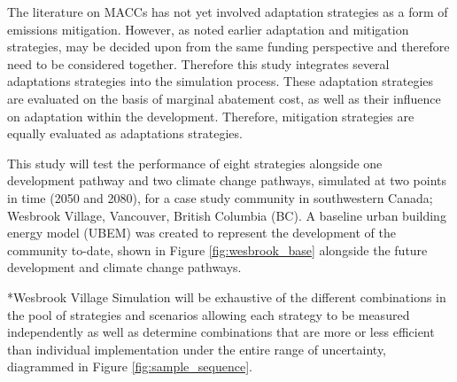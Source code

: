 \documentclass[twocolumn, a4paper,10pt]{article}
\makeatletter
\renewcommand\subsection{\@startsection{subsection}{1}{\z@}{\z@}{\z@}{\normalfont\normalsize\bfseries}}
\renewcommand\subsection{\@startsection{subsection}{1}{\z@}{\z@}{0.1pt}{\normalfont\normalsize\bfseries}}
\makeatother
\begin{document}
The literature on MACCs has not yet involved adaptation strategies as a form of emissions mitigation. However, as noted earlier adaptation and mitigation strategies, may be decided upon from the same funding perspective and therefore need to be considered together. Therefore this study integrates several adaptations strategies into the simulation process. These adaptation strategies are evaluated on the basis of marginal abatement cost, as well as their influence on adaptation within the development. Therefore, mitigation strategies are equally evaluated as adaptations strategies. 

This study will test the performance of eight strategies alongside one development pathway and two climate change pathways, simulated at two points in time (2050 and 2080), for a case study community in southwestern Canada; Wesbrook Village, Vancouver, British Columbia (BC). A baseline urban building energy model (UBEM) was created to represent the development of the community to-date, shown in Figure \ref{fig:wesbrook_base} alongside the future development and climate change pathways.



\subsection*{Wesbrook Village} 
Simulation will be exhaustive of the different combinations in the pool of strategies and scenarios allowing each strategy to be measured independently as well as determine combinations that are more or less efficient than individual implementation under the entire range of uncertainty, diagrammed in Figure \ref{fig:sample_sequence}.
\end{document}
